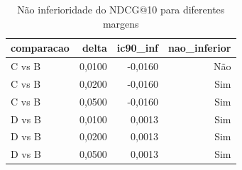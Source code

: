 \begin{table}[ht]
\centering
\caption{Não inferioridade do NDCG@10 para diferentes margens}
\label{tab:delta}
\begin{tabular}{lrrr}
\hline
\textbf{comparacao} & \textbf{delta} & \textbf{ic90\_inf} & \textbf{nao\_inferior} \\
\hline
C vs B & 0,0100 & -0,0160 & Não \\
C vs B & 0,0200 & -0,0160 & Sim \\
C vs B & 0,0500 & -0,0160 & Sim \\
D vs B & 0,0100 & 0,0013 & Sim \\
D vs B & 0,0200 & 0,0013 & Sim \\
D vs B & 0,0500 & 0,0013 & Sim \\
\hline
\end{tabular}
\end{table}
